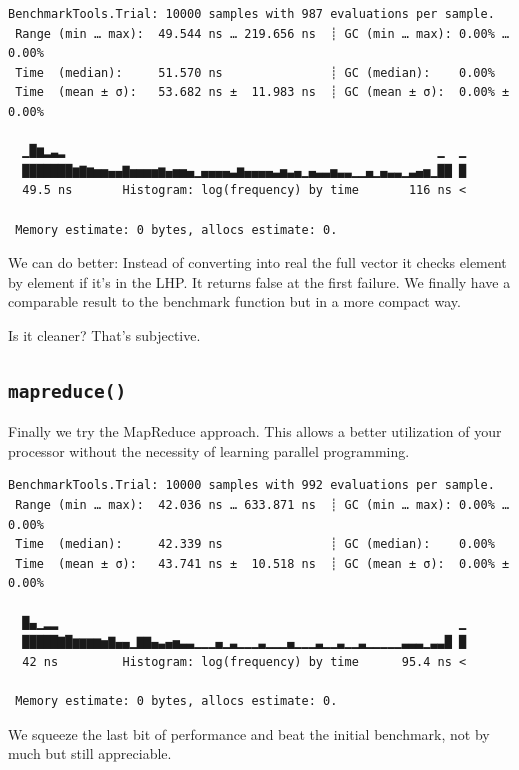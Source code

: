 \documentclass[
  8pt,
  a4paper,
]{book}
\newenvironment{Shaded}{\begin{snugshade}}{\end{snugshade}}
\newcommand{\FloatTok}[1]{\textcolor[rgb]{0.68,0.00,0.00}{#1}}
\newcommand{\FunctionTok}[1]{\textcolor[rgb]{0.28,0.35,0.67}{#1}}
\newcommand{\NormalTok}[1]{\textcolor[rgb]{0.00,0.23,0.31}{#1}}
\newcommand{\OperatorTok}[1]{\textcolor[rgb]{0.37,0.37,0.37}{#1}}
\newcommand{\PreprocessorTok}[1]{\textcolor[rgb]{0.68,0.00,0.00}{#1}}
\begin{document}
\begin{Shaded}
\end{Shaded}

\begin{verbatim}
BenchmarkTools.Trial: 10000 samples with 987 evaluations per sample.
 Range (min … max):  49.544 ns … 219.656 ns  ┊ GC (min … max): 0.00% … 0.00%
 Time  (median):     51.570 ns               ┊ GC (median):    0.00%
 Time  (mean ± σ):   53.682 ns ±  11.983 ns  ┊ GC (mean ± σ):  0.00% ± 0.00%

  ▁█▆▂▃▂                                                    ▁  ▁
  ███████▆▇▆▅▅▄▄▇▅▅▅▅▆▄▅▅▄▁▄▄▄▄▃▆▄▄▄▄▃▅▃▄▁▄▃▃▅▃▃▁▁▄▁▄▃▃▁▃▄▅▁██ █
  49.5 ns       Histogram: log(frequency) by time       116 ns <

 Memory estimate: 0 bytes, allocs estimate: 0.
\end{verbatim}

We can do better: Instead of converting into real the full vector it
checks element by element if it's in the LHP. It returns false at the
first failure. We finally have a comparable result to the benchmark
function but in a more compact way.

Is it cleaner? That's subjective.

\subsection{\texorpdfstring{\texttt{mapreduce()}}{mapreduce()}}\label{mapreduce}

Finally we try the MapReduce approach. This allows a better utilization
of your processor without the necessity of learning parallel
programming.

\begin{Shaded}
\end{Shaded}

\begin{verbatim}
BenchmarkTools.Trial: 10000 samples with 992 evaluations per sample.
 Range (min … max):  42.036 ns … 633.871 ns  ┊ GC (min … max): 0.00% … 0.00%
 Time  (median):     42.339 ns               ┊ GC (median):    0.00%
 Time  (mean ± σ):   43.741 ns ±  10.518 ns  ┊ GC (mean ± σ):  0.00% ± 0.00%

  █▄▁▂▂                                                        ▁
  █████▇█▆▆▆▆▅▇▄▄▁▇▇▄▃▄▅▃▃▁▁▁▄▁▃▁▁▁▃▁▁▁▄▁▁▁▃▁▁▃▁▁▃▁▁▁▁▁▃▃▃▁▃▃█ █
  42 ns         Histogram: log(frequency) by time      95.4 ns <

 Memory estimate: 0 bytes, allocs estimate: 0.
\end{verbatim}

We squeeze the last bit of performance and beat the initial benchmark,
not by much but still appreciable.


\backmatter
\end{document}
